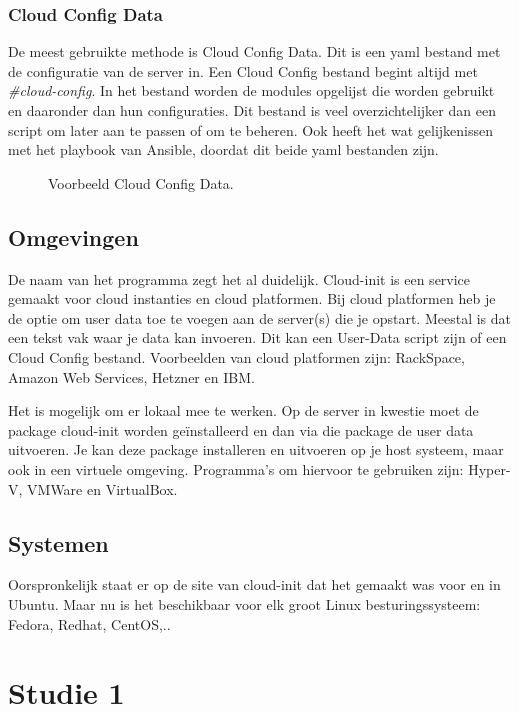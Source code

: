 \subsubsection{Cloud Config Data}
De meest gebruikte methode is Cloud Config Data. Dit is een yaml bestand met de configuratie van de server in. Een Cloud Config bestand begint altijd met \textit{\#cloud-config}. In het bestand worden de modules opgelijst die worden gebruikt en daaronder dan hun configuraties. Dit bestand is veel overzichtelijker dan een script om later aan te passen of om te beheren. Ook heeft het wat gelijkenissen met het playbook van Ansible, doordat dit beide yaml bestanden zijn.
\begin{figure}[!htb]
	\caption{Voorbeeld Cloud Config Data.}
	\label{fig:udatascript}
\end{figure}

\subsection{Omgevingen}
De naam van het programma zegt het al duidelijk. Cloud-init is een service gemaakt voor cloud instanties en cloud platformen. Bij cloud platformen heb je de optie om user data toe te voegen aan de server(s) die je opstart. Meestal is dat een tekst vak waar je data kan invoeren. Dit kan een User-Data script zijn of een Cloud Config bestand. Voorbeelden van cloud platformen zijn: RackSpace, Amazon Web Services, Hetzner en IBM. 

Het is mogelijk om er lokaal mee te werken. Op de server in kwestie moet de package cloud-init worden geïnstalleerd en dan via die package de user data uitvoeren. Je kan deze package installeren en uitvoeren op je host systeem, maar ook in een virtuele omgeving. Programma's om hiervoor te gebruiken zijn: Hyper-V, VMWare en VirtualBox.

\subsection{Systemen}
Oorspronkelijk staat er op de site van cloud-init \autocite{cloudsite} dat het gemaakt was voor en in Ubuntu. Maar nu is het beschikbaar voor elk groot Linux besturingssysteem: Fedora, Redhat, CentOS,..


\section{Studie 1}

